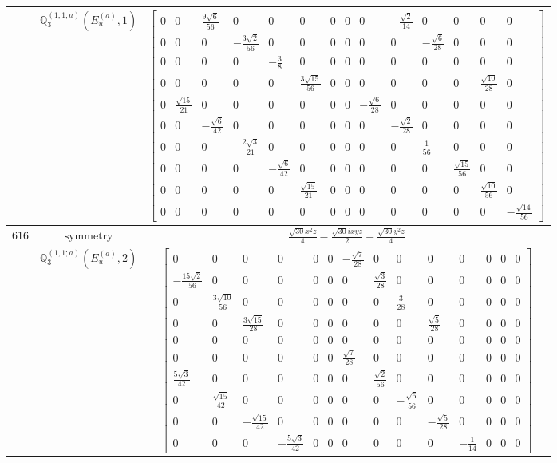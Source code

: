 \documentclass[fleqn,8pt,landscape]{jsarticle}
\begin{document}
\begin{longtable}{ccc}
$  $ & $ \mathbb{Q}_{3}^{(1,1;a)}(E_{u}^{(a)},1) $ & $ \begin{bmatrix} 0 & 0 & \frac{9 \sqrt{6}}{56} & 0 & 0 & 0 & 0 & 0 & 0 & - \frac{\sqrt{2}}{14} & 0 & 0 & 0 & 0 \\ 0 & 0 & 0 & - \frac{3 \sqrt{2}}{56} & 0 & 0 & 0 & 0 & 0 & 0 & - \frac{\sqrt{6}}{28} & 0 & 0 & 0 \\ 0 & 0 & 0 & 0 & - \frac{3}{8} & 0 & 0 & 0 & 0 & 0 & 0 & 0 & 0 & 0 \\ 0 & 0 & 0 & 0 & 0 & \frac{3 \sqrt{15}}{56} & 0 & 0 & 0 & 0 & 0 & 0 & \frac{\sqrt{10}}{28} & 0 \\ 0 & \frac{\sqrt{15}}{21} & 0 & 0 & 0 & 0 & 0 & 0 & - \frac{\sqrt{6}}{28} & 0 & 0 & 0 & 0 & 0 \\ 0 & 0 & - \frac{\sqrt{6}}{42} & 0 & 0 & 0 & 0 & 0 & 0 & - \frac{\sqrt{2}}{28} & 0 & 0 & 0 & 0 \\ 0 & 0 & 0 & - \frac{2 \sqrt{3}}{21} & 0 & 0 & 0 & 0 & 0 & 0 & \frac{1}{56} & 0 & 0 & 0 \\ 0 & 0 & 0 & 0 & - \frac{\sqrt{6}}{42} & 0 & 0 & 0 & 0 & 0 & 0 & \frac{\sqrt{15}}{56} & 0 & 0 \\ 0 & 0 & 0 & 0 & 0 & \frac{\sqrt{15}}{21} & 0 & 0 & 0 & 0 & 0 & 0 & \frac{\sqrt{10}}{56} & 0 \\ 0 & 0 & 0 & 0 & 0 & 0 & 0 & 0 & 0 & 0 & 0 & 0 & 0 & - \frac{\sqrt{14}}{56} \end{bmatrix} $ \\ \hline
$ 616 $ & $ \text{symmetry} $ & $ \frac{\sqrt{30} x^{2} z}{4} - \frac{\sqrt{30} i x y z}{2} - \frac{\sqrt{30} y^{2} z}{4} $ \\
$  $ & $ \mathbb{Q}_{3}^{(1,1;a)}(E_{u}^{(a)},2) $ & $ \begin{bmatrix} 0 & 0 & 0 & 0 & 0 & 0 & - \frac{\sqrt{7}}{28} & 0 & 0 & 0 & 0 & 0 & 0 & 0 \\ - \frac{15 \sqrt{2}}{56} & 0 & 0 & 0 & 0 & 0 & 0 & \frac{\sqrt{3}}{28} & 0 & 0 & 0 & 0 & 0 & 0 \\ 0 & \frac{3 \sqrt{10}}{56} & 0 & 0 & 0 & 0 & 0 & 0 & \frac{3}{28} & 0 & 0 & 0 & 0 & 0 \\ 0 & 0 & \frac{3 \sqrt{15}}{28} & 0 & 0 & 0 & 0 & 0 & 0 & \frac{\sqrt{5}}{28} & 0 & 0 & 0 & 0 \\ 0 & 0 & 0 & 0 & 0 & 0 & 0 & 0 & 0 & 0 & 0 & 0 & 0 & 0 \\ 0 & 0 & 0 & 0 & 0 & 0 & \frac{\sqrt{7}}{28} & 0 & 0 & 0 & 0 & 0 & 0 & 0 \\ \frac{5 \sqrt{3}}{42} & 0 & 0 & 0 & 0 & 0 & 0 & \frac{\sqrt{2}}{56} & 0 & 0 & 0 & 0 & 0 & 0 \\ 0 & \frac{\sqrt{15}}{42} & 0 & 0 & 0 & 0 & 0 & 0 & - \frac{\sqrt{6}}{56} & 0 & 0 & 0 & 0 & 0 \\ 0 & 0 & - \frac{\sqrt{15}}{42} & 0 & 0 & 0 & 0 & 0 & 0 & - \frac{\sqrt{5}}{28} & 0 & 0 & 0 & 0 \\ 0 & 0 & 0 & - \frac{5 \sqrt{3}}{42} & 0 & 0 & 0 & 0 & 0 & 0 & - \frac{1}{14} & 0 & 0 & 0 \end{bmatrix} $ \\ \hline

\end{longtable}
\end{document}
